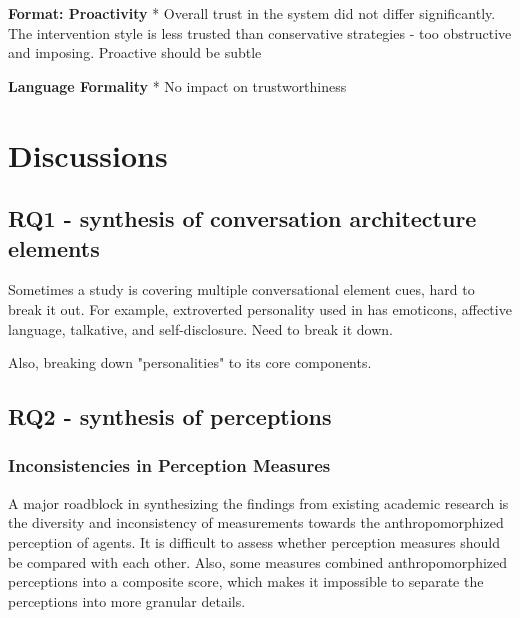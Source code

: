 \documentclass[sigconf,screen,review, anonymous]{acmart}
\newcommand{\cmt}[1]{}%
\begin{document}
\textbf{Format: Proactivity}
* Overall trust in the system did not differ significantly. The intervention style is less trusted than conservative strategies - too obstructive and imposing. Proactive should be subtle  \cite{kraus2020effects}\cmt{[64]}

\textbf{Language Formality}
* No impact on trustworthiness \cite{jestin2022effects}\cmt{[81]}


\section{Discussions}

\subsection{RQ1 - synthesis of conversation architecture elements}

Sometimes a study is covering multiple conversational element cues, hard to break it out. For example, extroverted personality used in \cite{volkel2022user}\cmt{[75]} has emoticons, affective language, talkative, and self-disclosure. Need to break it down.

Also, breaking down "personalities" to its core components.


\subsection{RQ2 - synthesis of perceptions}

\subsubsection{Inconsistencies in Perception Measures}

A major roadblock in synthesizing the findings from existing academic research is the diversity and inconsistency of measurements towards the anthropomorphized perception of agents. It is difficult to assess whether perception measures should be compared with each other. Also, some measures combined anthropomorphized perceptions into a composite score, which makes it impossible to separate the perceptions into more granular details.
\end{document}
